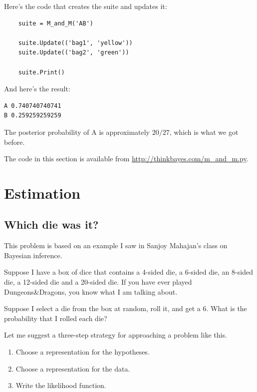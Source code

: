 \documentclass[12pt]{book}
\begin{document}
Here's the code that creates the suite and updates it:

\begin{verbatim}
    suite = M_and_M('AB')

    suite.Update(('bag1', 'yellow'))
    suite.Update(('bag2', 'green'))

    suite.Print()
\end{verbatim}

And here's the result:

\begin{verbatim}
A 0.740740740741
B 0.259259259259
\end{verbatim}

The posterior probability of A is approximately $20/27$, which
is what we got before.

The code in this section is available from
\url{http://thinkbayes.com/m_and_m.py}.


\chapter{Estimation}

\section{Which die was it?}

This problem is based on an example I saw in Sanjoy Mahajan's class
on Bayesian inference.

Suppose I have a box of dice that contains a 4-sided die, a 6-sided
die, an 8-sided die, a 12-sided die and a 20-sided die.  If you
have ever played Dungeons\&Dragons, you know what I am talking about.

Suppose I select a die from the box at random, roll it, and get a 6.
What is the probability that I rolled each die?

Let me suggest a three-step strategy for approaching a problem like this.

\begin{enumerate}

\item Choose a representation for the hypotheses.

\item Choose a representation for the data.

\item Write the likelihood function.

\end{enumerate}
\end{document}
